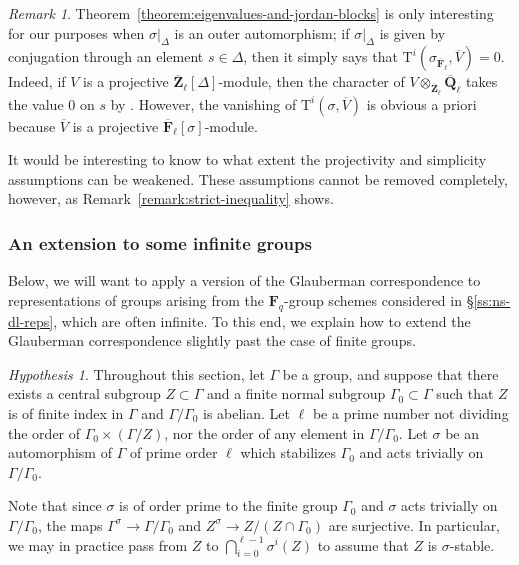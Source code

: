 \documentclass[reqno]{amsart}
\numberwithin{equation}{subsection}
\newcommand{\F}{\mathbf{F}}
\newcommand{\Q}{\mathbf{Q}}
\newcommand{\Z}{\mathbf{Z}}
\newcommand{\ol}[1]{\overline{#1}}
\newcommand{\rT}{\ensuremath{\mathrm{T}}\xspace}
\theoremstyle{remark}
\newtheorem{remark}[thm]{Remark}
\newtheorem{hypothesis}[thm]{Hypothesis}
\numberwithin{equation}{subsection}
\numberwithin{figure}{subsection}
\begin{document}
\begin{remark}
    Theorem~\ref{theorem:eigenvalues-and-jordan-blocks} is only interesting for our purposes when $\sigma|_\Delta$ is an outer automorphism; if $\sigma|_\Delta$ is given by conjugation through an element $s \in \Delta$, then it simply says that $\rT^i(\sigma_{\ol\F_\ell}, \ol V) = 0$. Indeed, if $V$ is a projective $\ol\Z_\ell[\Delta]$-module, then the character of $V \otimes_{\ol\Z_\ell} \ol\Q_\ell$ takes the value $0$ on $s$ by \cite[\S 16.2, Theorem~36]{Serre77}. However, the vanishing of $\rT^i(\sigma, \ol V)$ is obvious a priori because $\ol V$ is a projective $\ol\F_\ell[\sigma]$-module.
    
    It would be interesting to know to what extent the projectivity and simplicity assumptions can be weakened. These assumptions cannot be removed completely, however, as Remark~\ref{remark:strict-inequality} shows.
\end{remark}



\subsubsection{An extension to some infinite groups}\label{sss:infinite-glauberman}

Below, we will want to apply a version of the Glauberman correspondence to representations of groups arising from the $\F_q$-group schemes considered in \S\ref{ss:ns-dl-reps}, which are often infinite. To this end, we explain how to extend the Glauberman correspondence slightly past the case of finite groups.

\begin{hypothesis}\label{hypothesis:infinite-glauberman}
    Throughout this section, let $\Gamma$ be a group, and suppose that there exists a central subgroup $Z \subset \Gamma$ and a finite normal subgroup $\Gamma_0 \subset \Gamma$ such that $Z$ is of finite index in $\Gamma$ and $\Gamma/\Gamma_0$ is abelian. Let $\ell$ be a prime number not dividing the order of $\Gamma_0 \times (\Gamma/Z)$, nor the order of any element in $\Gamma/\Gamma_0$. Let $\sigma$ be an automorphism of $\Gamma$ of prime order $\ell$ which stabilizes $\Gamma_0$ and acts trivially on $\Gamma/\Gamma_0$.
\end{hypothesis}

Note that since $\sigma$ is of order prime to the finite group $\Gamma_0$ and $\sigma$ acts trivially on $\Gamma/\Gamma_0$, the maps $\Gamma^\sigma \to \Gamma/\Gamma_0$ and $Z^\sigma \to Z/(Z \cap \Gamma_0)$ are surjective. In particular, we may in practice pass from $Z$ to $\bigcap_{i=0}^{\ell-1} \sigma^i(Z)$ to assume that $Z$ is $\sigma$-stable.
\end{document}

